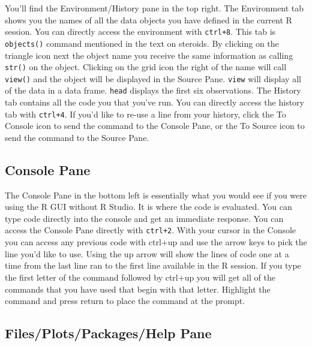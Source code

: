 \documentclass[]{book}
\begin{document}
You'll find the Environment/History pane in the top right. The Environment tab shows you the names of all the data objects you have defined in the current R session. You can directly access the environment with \texttt{ctrl+8}. This tab is \texttt{objects()} command mentioned in the text on steroids. By clicking on the triangle icon next the object name you receive the same information as calling \texttt{str()} on the object. Clicking on the grid icon the right of the name will call \texttt{view()} and the object will be displayed in the Source Pane. \texttt{view} will display all of the data in a data frame. \texttt{head} displays the first six observations. The History tab contains all the code you that you've run. You can directly access the history tab with \texttt{ctrl+4}. If you'd like to re-use a line from your history, click the To Console icon to send the command to the Console Pane, or the To Source icon to send the command to the Source Pane.

\hypertarget{console-pane}{%
\subsection{Console Pane}\label{console-pane}}

The Console Pane in the bottom left is essentially what you would see if you were using the R GUI without R Studio. It is where the code is evaluated. You can type code directly into the console and get an immediate response. You can access the Console Pane directly with \texttt{ctrl+2}. With your cursor in the Console you can access any previous code with ctrl+up and use the arrow keys to pick the line you'd like to use. Using the up arrow will show the lines of code one at a time from the last line ran to the first line available in the R session. If you type the first letter of the command followed by ctrl+up you will get all of the commands that you have used that begin with that letter. Highlight the command and press return to place the command at the prompt.

\hypertarget{filesplotspackageshelp-pane}{%
\subsection{Files/Plots/Packages/Help Pane}\label{filesplotspackageshelp-pane}}
\end{document}
